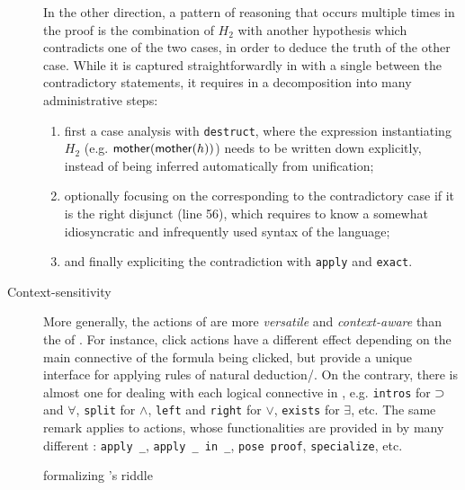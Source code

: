 \begin{description}
  In the other direction, a pattern of reasoning that occurs multiple times in
  the proof is the combination of $H_2$ with another hypothesis which
  contradicts one of the two cases, in order to deduce the truth of the other
  case. While it is captured straightforwardly in  with a single 
  between the contradictory statements, it requires in  a decomposition into
  many administrative steps:
  \begin{enumerate}
    \item first a case analysis with \texttt{destruct}, where the expression
    instantiating $H_2$ (e.g. $\mbox{\textsf{mother}}(\mbox{\textsf{mother}}(h))$) needs to be written down
    explicitly, instead of being inferred automatically from unification;
    \item optionally focusing on the  corresponding to the contradictory
    case if it is the right disjunct (line 56), which requires to know a
    somewhat idiosyncratic and infrequently used syntax of the  language;
    \item and finally expliciting the contradiction with \texttt{apply} and
    \texttt{exact}.
  \end{enumerate}

  \item[Context-sensitivity] More generally, the actions of  are more
  \emph{versatile} and \emph{context-aware} than the  of .
  For instance, click actions have a different effect depending on the main
  connective of the formula being clicked, but provide a unique interface for
  applying rules of natural deduction/. On the contrary,
  there is almost one  for dealing with each logical connective in
  , e.g. \texttt{intros} for $\supset$ and $\forall$, \texttt{split} for
  $\land$, \texttt{left} and \texttt{right} for $\lor$, \texttt{exists} for
  $\exists$, etc. The same remark applies to  actions, whose
  functionalities are provided in  by many different :
  \texttt{apply \_}, \texttt{apply \_ in \_}, \texttt{pose proof},
  \texttt{specialize}, etc.
\end{description}

\begin{figure}
  
  \caption{  formalizing 's riddle}
\end{figure}

